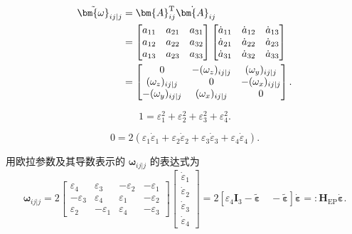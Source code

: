 \begin{align}
    \tilde{\bm{\omega}}_{ij|j} &= \bm{A}_{ij}^{\mathrm{T}}\dot{\bm{A}}_{ij}\notag\\
    &= \begin{bmatrix}
        a_{11} & a_{21} & a_{31}\\
        a_{12} & a_{22} & a_{32}\\
        a_{13} & a_{23} & a_{33}
    \end{bmatrix}
    \begin{bmatrix}
        \dot{a}_{11} & \dot{a}_{12} & \dot{a}_{13}\\
        \dot{a}_{21} & \dot{a}_{22} & \dot{a}_{23}\\
        \dot{a}_{31} & \dot{a}_{32} & \dot{a}_{33}
    \end{bmatrix}\notag\\
    &= \begin{bmatrix}
        0 & -(\omega_z)_{ij|j} & (\omega_y)_{ij|j}\\
        (\omega_z)_{ij|j} & 0 & -(\omega_x)_{ij|j}\\
        -(\omega_y)_{ij|j} & (\omega_x)_{ij|j} & 0
    \end{bmatrix}.
\end{align}

\begin{equation}
    1 = \varepsilon_1^2 + \varepsilon_2^2 + \varepsilon_3^2 + \varepsilon_4^2.
\end{equation}

\begin{equation}
    0 = 2(\varepsilon_1\dot{\varepsilon}_1 + \varepsilon_2\dot{\varepsilon}_2 + \varepsilon_3\dot{\varepsilon}_3 + \varepsilon_4\dot{\varepsilon}_4).
\end{equation}


用欧拉参数及其导数表示的 $\bm{\omega}_{ij|j}$ 的表达式为
\begin{equation}
    \bm{\omega}_{ij|j} = 2\begin{bmatrix}
        \varepsilon_4 & \varepsilon_3 & -\varepsilon_2 & -\varepsilon_1\\
        -\varepsilon_3 & \varepsilon_4 & \varepsilon_1 & -\varepsilon_2\\
        \varepsilon_2 & -\varepsilon_1 & \varepsilon_4 & -\varepsilon_3
    \end{bmatrix}
    \begin{bmatrix}
        \dot{\varepsilon}_1\\
        \dot{\varepsilon}_2\\
        \dot{\varepsilon}_3\\
        \dot{\varepsilon}_4
    \end{bmatrix}
    = 2\left[\varepsilon_4\bm{I}_3 - \tilde{\bm{\varepsilon}}\quad -\tilde{\bm{\varepsilon}}\right]\dot{\bm{\varepsilon}} =: \bm{H}_{\mathrm{EP}}\dot{\bm{\varepsilon}}.
\end{equation}

